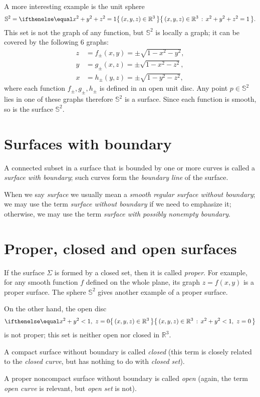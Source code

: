 A more interesting example is the unit sphere 
\[\mathbb{S}^2=\set{(x,y,z)\in\mathbb{R}^3}{x^2+y^2+z^2=1}.\]
This set is not the graph of any function,
but $\mathbb{S}^2$ is locally a graph;
it can be covered by the following 6 graphs:
\begin{align*}
z&=f_\pm(x,y)=\pm \sqrt{1-x^2-y^2},
\\
y&=g_\pm(x,z)=\pm \sqrt{1-x^2-z^2},
\\
x&=h_\pm(y,z)=\pm \sqrt{1-y^2-z^2},
\end{align*}
where each function $f_\pm,g_\pm,h_\pm$ is defined in an open unit disc.
Any point $p\in\mathbb{S}^2$ lies in one of these graphs therefore $\mathbb{S}^2$ is a surface.
Since each function is smooth, so is the surface $\mathbb{S}^2$.

\section{Surfaces with boundary}
A connected subset in a surface that is bounded by one or more 
curves is called a \emph{surface with boundary}; such curves form the \emph{boundary line} of the surface.

When we say {}\emph{surface} we usually mean a {}\emph{smooth regular surface without boundary};
we may use the term {}\emph{surface without boundary} if we need to emphasize it;
otherwise, we may use the term {}\emph{surface with possibly nonempty boundary}.

\section{Proper, closed and open surfaces}
If the surface $\Sigma$ is formed by a closed set, then it is called \emph{proper}.
For example, for any smooth function $f$ defined on the whole plane, its graph $z=f(x,y)$ is a proper surface.
The sphere $\mathbb{S}^2$ gives another example of a proper surface.

On the other hand, the open disc 
\[\set{(x,y,z)\in\mathbb{R}^3}{x^2+y^2<1,\  z=0}\]
is not proper; this set is neither open nor closed in $\mathbb{R}^3$.

A compact surface without boundary is called \emph{closed}
(this term is closely related to the {}\emph{closed curve}, but has nothing to do with {}\emph{closed set}).

A proper noncompact surface without boundary is called \emph{open} (again, the term {}\emph{open curve} is relevant, but {}\emph{open set} is not).

